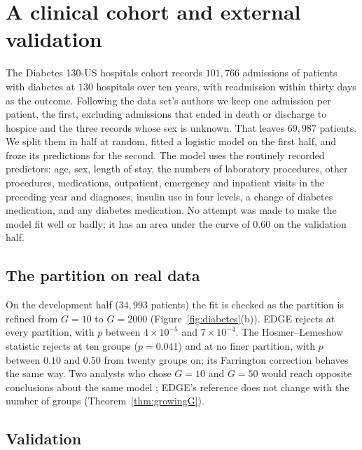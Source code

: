 \section{A clinical cohort and external validation}\label{sec:realdata}

The Diabetes 130-US hospitals cohort \citep{strack2014impact,clore2014uci} records $101{,}766$
admissions of patients with diabetes at $130$ hospitals over ten years, with readmission within
thirty days as the outcome. Following the data set's authors we keep one admission per patient, the
first, excluding admissions that ended in death or discharge to hospice and the three records whose sex
is unknown. That leaves $69{,}987$ patients. We split them in half at random, fitted a logistic model on
the first half, and froze its predictions for the second. The model uses the routinely recorded
predictors: age, sex, length of stay, the numbers of laboratory procedures, other procedures,
medications, outpatient, emergency and inpatient visits in the preceding year and diagnoses, insulin
use in four levels, a change of diabetes medication, and any diabetes medication. No attempt was made
to make the model fit well or badly; it has an area under the curve of $0.60$ on the validation half.

\subsection{The partition on real data}\label{sec:realpartition}

On the development half ($34{,}993$ patients) the fit is checked as the partition is refined from
$G=10$ to $G=2000$ (Figure~\ref{fig:diabetes}(b)). EDGE rejects at every partition,
with $p$ between $4\times10^{-5}$ and $7\times10^{-4}$. The Hosmer--Lemeshow statistic rejects at ten
groups ($p=0.041$) and at no finer partition, with $p$ between $0.10$ and $0.50$ from twenty groups on;
its Farrington correction behaves the same way. Two analysts who chose $G=10$ and $G=50$ would reach
opposite conclusions about the same model \citep{paul2013power}; EDGE's reference does not change
with the number of groups (Theorem~\ref{thm:growingG}).

\subsection{Validation}\label{sec:realvalidation}

